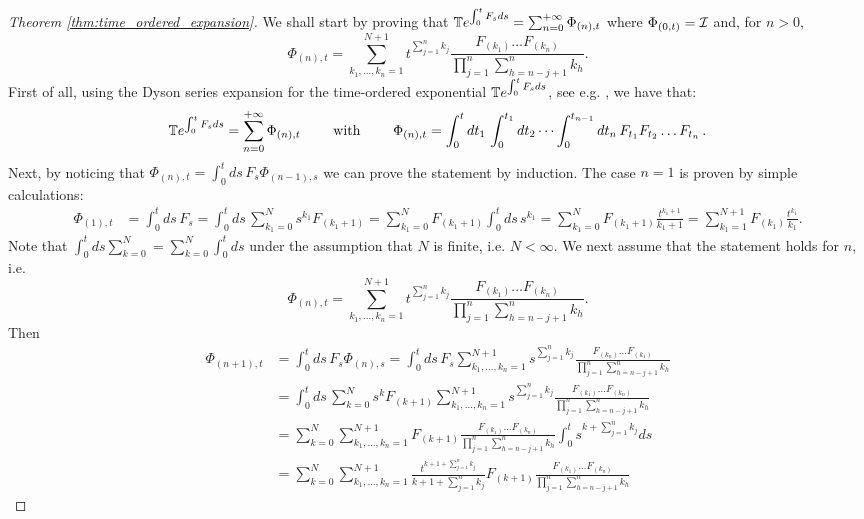 \begin{proof}[Theorem \ref{thm:time_ordered_expansion}]
    We shall start by proving that $\mathbb{T} e^{\int_0^t F_s ds} = \sum_{n=0}^{+\infty} \Phi_{(n),t}$ where $\Phi_{(0,t)} = \mathcal{I}$ and, for $n>0$, \[\Phi_{(n),t} = \sum_{k_1,\dots,k_n=1}^{N+1} t^{\sum_{j=1}^n k_j} \frac{ F_{(k_1)} \dots F_{(k_n)}}{\prod_{j=1}^n \sum_{h=n-j+1}^n k_h}.\]
    First of all, using the Dyson series expansion for the time-ordered exponential $\mathbb{T} e^{\int_0^t F_s ds}$, see e.g. \cite{Dyson, argeri2014magnus, sakurai2020modern}, we have that: 
    \[\mathbb{T} e^{\int_0^t F_s ds} = \sum_{n=0}^{+\infty} \Phi_{(n),t} \qquad\text{ with }\qquad 
    \Phi_{(n),t} = \int_0^t dt_1\, \int_0^{t_1} dt_2\, \dots \int_0^{t_{n-1}} dt_n\, F_{t_1}F_{t_2}\dots F_{t_n}\,    .\]
    Next, by noticing that \(\Phi_{(n),t} = \int_0^t ds\, F_{s} \Phi_{(n-1),s} \) we can prove the statement by induction.
    The case $n=1$ is proven by simple calculations:
    \begin{align*}
        \Phi_{(1),t} &= \int_0^t ds\, F_{s}  = \int_0^t ds\, \sum_{k_1=0}^N s^{k_1}F_{(k_1+1)} = \sum_{k_1=0}^{N} F_{(k_1+1)} \int_0^t ds\, s^{k_1}  
        = \sum_{k_1=0}^{N} F_{(k_1+1)} \frac{t^{k_1+1}}{k_1+1} 
         = \sum_{k_1=1}^{N+1} F_{(k_1)} \frac{t^{k_1}}{k_1}.
    \end{align*}
    Note that $\int_0^t ds \sum_{k=0}^N = \sum_{k=0}^{N} \int_0^t ds$ under the assumption that $N$ is finite, i.e. $N<\infty$. 
    We next assume that the statement holds for $n$, i.e. 
    \[\Phi_{(n),t} = \sum_{k_1,\dots,k_n=1}^{N+1} t^{\sum_{j=1}^n k_j} \frac{F_{(k_1)}\dots F_{(k_n)}}{\prod_{j=1}^n \sum_{h=n-j+1}^n k_h}.\]
    Then 
    \begin{align*}
        \Phi_{(n+1),t} &= \int_0^t ds\, F_s \Phi_{(n),s} 
        = \int_0^t ds\, F_s \sum_{k_1,\dots,k_n=1}^{N+1} s^{\sum_{j=1}^n k_j} \frac{ F_{(k_n)}\dots F_{(k_1)}}{\prod_{j=1}^n \sum_{h=n-j+1}^n k_h} \\
        &= \int_0^t ds\, \sum_{k=0}^{N} s^k F_{(k+1)} \sum_{k_1,\dots,k_n=1}^{N+1}  s^{\sum_{j=1}^n k_j} \frac{ F_{(k_1)} \dots F_{(k_n)}}{\prod_{j=1}^n \sum_{h=n-j+1}^n k_h} \\
        &= \sum_{k=0}^{N} \sum_{k_1,\dots,k_n=1}^{N+1} F_{(k+1)} \frac{ F_{(k_1)}\dots F_{(k_n)}}{\prod_{j=1}^n \sum_{h=n-j+1}^n k_h}  \int_0^t s^{k+\sum_{j=1}^n k_j} ds \\
        &= \sum_{k=0}^{N} \sum_{k_1,\dots,k_n=1}^{N+1} \frac{t^{k+1+\sum_{j=1}^n k_j}}{k+1+\sum_{j=1}^n k_j} F_{(k+1)} \frac{F_{(k_1)}\dots F_{(k_n)}}{\prod_{j=1}^n \sum_{h=n-j+1}^n k_h}

\end{align*}
\end{proof}
